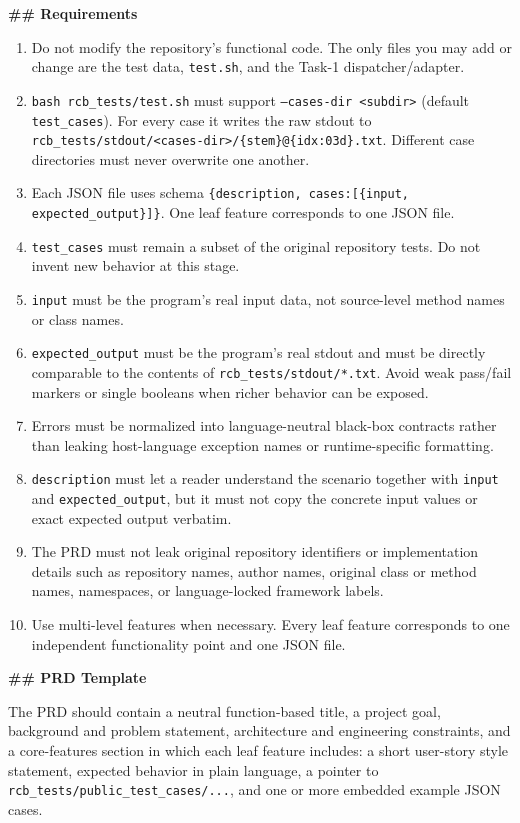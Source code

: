 \begin{promptbox}
\textbf{\#\# Requirements}
\begin{enumerate}
\item Do not modify the repository's functional code. The only files you may add or change are the test data, \texttt{test.sh}, and the Task-1 dispatcher/adapter.
\item \texttt{bash rcb\_tests/test.sh} must support \texttt{--cases-dir <subdir>} (default \texttt{test\_cases}). For every case it writes the raw stdout to \texttt{rcb\_tests/stdout/<cases-dir>/\{stem\}@\{idx:03d\}.txt}. Different case directories must never overwrite one another.
\item Each JSON file uses schema \texttt{\{description, cases:[\{input, expected\_output\}]\}}. One leaf feature corresponds to one JSON file.
\item \texttt{test\_cases} must remain a subset of the original repository tests. Do not invent new behavior at this stage.
\item \texttt{input} must be the program's real input data, not source-level method names or class names.
\item \texttt{expected\_output} must be the program's real stdout and must be directly comparable to the contents of \texttt{rcb\_tests/stdout/*.txt}. Avoid weak pass/fail markers or single booleans when richer behavior can be exposed.
\item Errors must be normalized into language-neutral black-box contracts rather than leaking host-language exception names or runtime-specific formatting.
\item \texttt{description} must let a reader understand the scenario together with \texttt{input} and \texttt{expected\_output}, but it must not copy the concrete input values or exact expected output verbatim.
\item The PRD must not leak original repository identifiers or implementation details such as repository names, author names, original class or method names, namespaces, or language-locked framework labels.
\item Use multi-level features when necessary. Every leaf feature corresponds to one independent functionality point and one JSON file.
\end{enumerate}

\textbf{\#\# PRD Template}

The PRD should contain a neutral function-based title, a project goal, background and problem statement, architecture and engineering constraints, and a core-features section in which each leaf feature includes: a short user-story style statement, expected behavior in plain language, a pointer to \texttt{rcb\_tests/public\_test\_cases/...}, and one or more embedded example JSON cases.


\end{promptbox}
